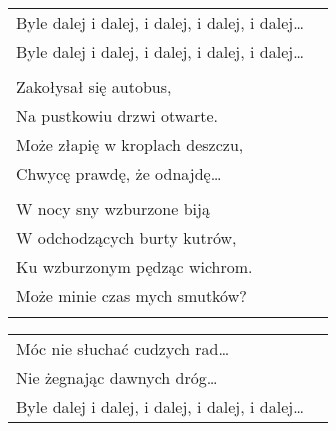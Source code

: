 \documentclass[a5paper]{article}
\begin{document}
\noindent
\begin{tabular}{@{}p{8.5cm}p{3cm}@{}}
Byle dalej i dalej, i dalej, i dalej, i dalej… \\
Byle dalej i dalej, i dalej, i dalej, i dalej…\\ \\

Zakołysał się autobus, \\
Na pustkowiu drzwi otwarte.\\ 
Może złapię w kroplach deszczu, \\
Chwycę prawdę, że odnajdę… \\ \\

W nocy sny wzburzone biją \\
W odchodzących burty kutrów,\\ 
Ku wzburzonym pędząc wichrom. \\
Może minie czas mych smutków?\\ \\
\end{tabular}

\noindent
\begin{tabular}{@{}p{8.5cm}p{3cm}@{}}
	Móc nie słuchać cudzych rad… \\
	Nie żegnając dawnych dróg… \\
	Byle dalej i dalej, i dalej, i dalej, i dalej… 
\end{tabular}
\end{document}
